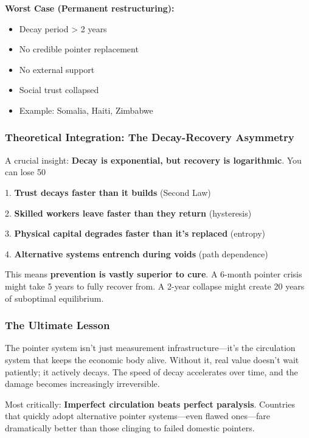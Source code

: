 \documentclass[11pt,oneside]{book}
\begin{document}
\textbf{Worst Case (Permanent restructuring):}
\begin{itemize}
\item Decay period > 2 years
\item No credible pointer replacement
\item No external support
\item Social trust collapsed
\item Example: Somalia, Haiti, Zimbabwe
\end{itemize}

\subsubsection{Theoretical Integration: The Decay-Recovery Asymmetry}

A crucial insight: \textbf{Decay is exponential, but recovery is logarithmic}. You can lose 50%


1. \textbf{Trust decays faster than it builds} (Second Law)


2. \textbf{Skilled workers leave faster than they return} (hysteresis)


3. \textbf{Physical capital degrades faster than it's replaced} (entropy)


4. \textbf{Alternative systems entrench during voids} (path dependence)


This means \textbf{prevention is vastly superior to cure}. A 6-month pointer crisis might take 5 years to fully recover from. A 2-year collapse might create 20 years of suboptimal equilibrium.

\subsubsection{The Ultimate Lesson}

The pointer system isn't just measurement infrastructure—it's the circulation system that keeps the economic body alive. Without it, real value doesn't wait patiently; it actively decays. The speed of decay accelerates over time, and the damage becomes increasingly irreversible.

Most critically: \textbf{Imperfect circulation beats perfect paralysis}. Countries that quickly adopt alternative pointer systems—even flawed ones—fare dramatically better than those clinging to failed domestic pointers.
\end{document}

